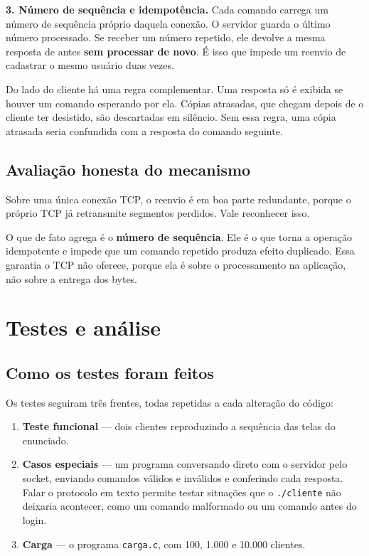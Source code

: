 \documentclass[12pt,a4paper]{article}
\begin{document}
\vspace{6pt}
\noindent\textbf{3. Número de sequência e idempotência.} Cada comando carrega um
número de sequência próprio daquela conexão. O servidor guarda o último número
processado. Se receber um número repetido, ele devolve a mesma resposta de antes
\textbf{sem processar de novo}. É isso que impede um reenvio de cadastrar o
mesmo usuário duas vezes.

Do lado do cliente há uma regra complementar. Uma resposta só é exibida se
houver um comando esperando por ela. Cópias atrasadas, que chegam depois de o
cliente ter desistido, são descartadas em silêncio. Sem essa regra, uma cópia
atrasada seria confundida com a resposta do comando seguinte.

\subsection{Avaliação honesta do mecanismo}

Sobre uma única conexão TCP, o reenvio é em boa parte redundante, porque o
próprio TCP já retransmite segmentos perdidos. Vale reconhecer isso.

O que de fato agrega é o \textbf{número de sequência}. Ele é o que torna a
operação idempotente e impede que um comando repetido produza efeito duplicado.
Essa garantia o TCP não oferece, porque ela é sobre o processamento na
aplicação, não sobre a entrega dos bytes.

\section{Testes e análise}

\subsection{Como os testes foram feitos}

Os testes seguiram três frentes, todas repetidas a cada alteração do código:

\begin{enumerate}
  \item \textbf{Teste funcional} --- dois clientes reproduzindo a sequência das
        telas do enunciado.
  \item \textbf{Casos especiais} --- um programa conversando direto com
        o servidor pelo socket, enviando comandos válidos e inválidos e
        conferindo cada resposta. Falar o protocolo em texto permite testar
        situações que o \texttt{./cliente} não deixaria acontecer, como um
        comando malformado ou um comando antes do login.
  \item \textbf{Carga} --- o programa \texttt{carga.c}, com 100, 1.000 e 10.000
        clientes.
\end{enumerate}
\end{document}
